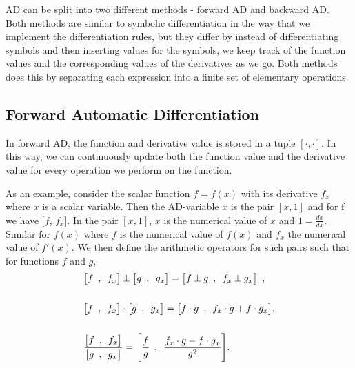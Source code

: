 AD can be split into two different methods - forward AD and backward AD. Both methods are similar to symbolic differentiation in the way that we implement the differentiation rules, but they differ by instead of differentiating symbols and then inserting values for the symbols, we keep track of the function values and the corresponding values of the derivatives as we go. Both methods does this by separating each expression into a finite set of elementary operations. 

\subsection{Forward Automatic Differentiation}
In forward AD, the function and derivative value is stored in a tuple $[\cdot, \cdot]$. In this way, we can continuously update both the function value and the derivative value for every operation we perform on the function. 

As an example, consider the scalar function $f = f(x)$ with its derivative $f_x$ where $x$ is a scalar variable. Then the AD-variable $x$ is the pair $[x, 1]$ and for f we have [$f$, $f_x$]. In the pair $[x,1]$, $x$ is the numerical value of $x$ and $1 = \frac{dx}{dx}$. Similar for $f(x)$ where $f$ is the numerical value of $f(x)$ and $f_x$ the numerical value of $f'(x)$.  We then define the arithmetic operators for such pairs such that for functions $f$ and $g$,
\begin{equation}
    \begin{aligned}
    &\big[f \hspace{0.5em} , \hspace{0.5em}  f_x\big] \pm \big[g \hspace{0.5em} , \hspace{0.5em}  g_x\big] = \big[f \pm g \hspace{0.5em} , \hspace{0.5em}  f_x \pm g_x\big] \hspace{0.5em}, \\\\
    &\big[f \hspace{0.5em} , \hspace{0.5em}  f_x\big]\cdot \big[g \hspace{0.5em} , \hspace{0.5em}  g_x\big] = \big[f\cdot g \hspace{0.5em} , \hspace{0.5em}  f_x\cdot g + f\cdot g_x\big],\\\\
    &\frac{\big[f \hspace{0.5em} , \hspace{0.5em}  f_x\big]}{\big[g \hspace{0.5em} , \hspace{0.5em}  g_x\big]} = \Bigg[\frac{f}{g} \hspace{0.5em} , \hspace{0.5em}  \frac{f_x\cdot g - f\cdot g_x}{g^2}\Bigg].
\end{aligned}
\label{eq:arithmeticOperators}
\end{equation}

